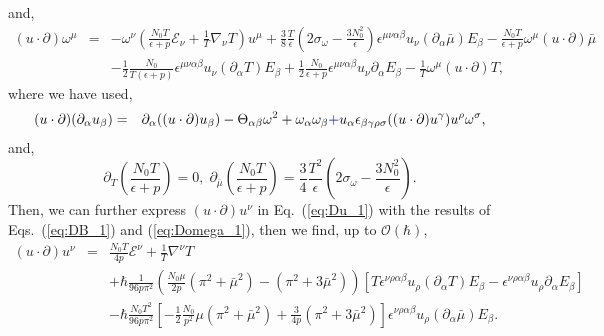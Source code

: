\documentclass[aps,prd,showkeys,preprint,amsmath,amssymb,nofootinbib]{revtex4-1}
\begin{document}
and, 
\begin{eqnarray}
(u\cdot\partial)\omega^{\mu} & = & -\omega^{\nu}\left(\frac{N_{0}T}{\epsilon+p}\mathcal{E}_{\nu}+\frac{1}{T}\nabla_{\nu}T\right)u^{\mu}+\frac{3}{8}\frac{T}{\epsilon}\left(2\sigma_{\omega}-\frac{3N_{0}^{2}}{\epsilon}\right)\epsilon^{\mu\nu\alpha\beta}u_{\nu}(\partial_{\alpha}\bar{\mu})E_{\beta}-\frac{N_{0}T}{\epsilon+p}\omega^{\mu}(u\cdot \partial)\bar{\mu}\nonumber \\
 &  & -\frac{1}{2}\frac{N_{0}}{T(\epsilon+p)}\epsilon^{\mu\nu\alpha\beta}u_{\nu}(\partial_{\alpha}T)E_{\beta}+\frac{1}{2}\frac{N_{0}}{\epsilon+p}\epsilon^{\mu\nu\alpha\beta}u_{\nu}\partial_{\alpha}E_{\beta}-\frac{1}{T}\omega^{\mu}(u\cdot \partial)T,\label{eq:Domega_1}
\end{eqnarray}
where we have used, 
\begin{eqnarray}
(u\cdot\partial)(\partial_{\alpha}u_{\beta}) & = & \partial_{\alpha}((u\cdot\partial)u_{\beta})-\Theta_{\alpha\beta}\omega^{2}+\omega_{\alpha}\omega_{\beta}{\color{blue}+}u_{\alpha}\epsilon_{\beta\gamma\rho\sigma}((u\cdot\partial)u^{\gamma})u^{\rho}\omega^{\sigma},
\end{eqnarray}
and,
\begin{equation}
\partial_{T}\left(\frac{N_{0}T}{\epsilon+p}\right)=0,\;\partial_{\bar{\mu}}\left(\frac{N_{0}T}{\epsilon+p}\right)=\frac{3}{4}\frac{T^{2}}{\epsilon}\left(2\sigma_{\omega}-\frac{3N_{0}^{2}}{\epsilon}\right).
\end{equation}
Then, we can further express $(u\cdot\partial)u^{\nu}$ in Eq.~(\ref{eq:Du_1})
with the results of Eqs.~(\ref{eq:DB_1}) and (\ref{eq:Domega_1}), then
we find, up to $\mathcal{O}(\hbar)$,
\begin{eqnarray}
(u\cdot\partial)u^{\nu} & = & \frac{N_{0}T}{4p}\mathcal{E}^{\nu}+\frac{1}{T}\nabla^{\nu}T\nonumber \\
 &  & +\hbar \frac{1}{96p\pi^{2}}\left(\frac{N_{0}\mu}{2p}(\pi^{2}+\bar{\mu}^{2})-\left(\pi^{2}+3\bar{\mu}^{2}\right)\right)\left[T\epsilon^{\nu\rho\alpha\beta}u_{\rho}(\partial_{\alpha}T)E_{\beta}-\epsilon^{\nu\rho\alpha\beta}u_{\rho}\partial_{\alpha}E_{\beta}\right]\nonumber \\
 &  & -\hbar \frac{N_{0}T^{2}}{96p\pi^{2}}\left[-\frac{1}{2}\frac{N_{0}}{p^{2}}\mu(\pi^{2}+\bar{\mu}^{2})+\frac{3}{4p}(\pi^{2}+3\bar{\mu}^{2})\right]\epsilon^{\nu\rho\alpha\beta}u_{\rho}(\partial_{\alpha}\bar{\mu})E_{\beta}.\label{eq:Du_2}
\end{eqnarray}
\end{document}

